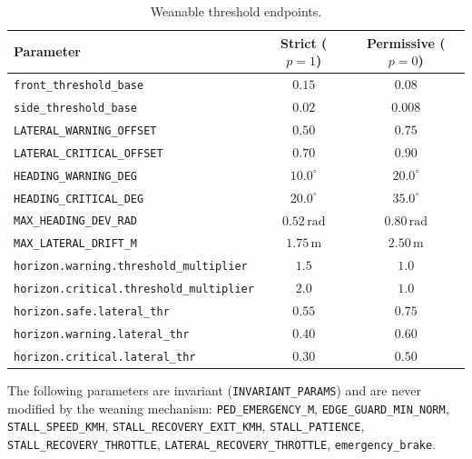 \begin{table}[H]
  \centering
  \caption{Weanable threshold endpoints.}
  \label{tab:hp-weanable}
  \small
  \begin{tabular}{@{}lcc@{}}
    \toprule
    \textbf{Parameter} & \textbf{Strict (\(p=1\))} & \textbf{Permissive (\(p=0\))} \\
    \midrule
    \texttt{front\_threshold\_base}                 & \(0.15\) & \(0.08\) \\
    \texttt{side\_threshold\_base}                  & \(0.02\) & \(0.008\) \\
    \texttt{LATERAL\_WARNING\_OFFSET}               & \(0.50\) & \(0.75\) \\
    \texttt{LATERAL\_CRITICAL\_OFFSET}              & \(0.70\) & \(0.90\) \\
    \texttt{HEADING\_WARNING\_DEG}                  & \(10.0^\circ\) & \(20.0^\circ\) \\
    \texttt{HEADING\_CRITICAL\_DEG}                 & \(20.0^\circ\) & \(35.0^\circ\) \\
    \texttt{MAX\_HEADING\_DEV\_RAD}                 & \(0.52\,\mathrm{rad}\) & \(0.80\,\mathrm{rad}\) \\
    \texttt{MAX\_LATERAL\_DRIFT\_M}                 & \(1.75\,\mathrm{m}\) & \(2.50\,\mathrm{m}\) \\
    \texttt{horizon.warning.threshold\_multiplier}  & \(1.5\) & \(1.0\) \\
    \texttt{horizon.critical.threshold\_multiplier} & \(2.0\) & \(1.0\) \\
    \texttt{horizon.safe.lateral\_thr}              & \(0.55\) & \(0.75\) \\
    \texttt{horizon.warning.lateral\_thr}           & \(0.40\) & \(0.60\) \\
    \texttt{horizon.critical.lateral\_thr}          & \(0.30\) & \(0.50\) \\
    \bottomrule
  \end{tabular}
\end{table}

The following parameters are invariant (\texttt{INVARIANT\_PARAMS}) and are
never modified by the weaning mechanism:
\texttt{PED\_EMERGENCY\_M}, \texttt{EDGE\_GUARD\_MIN\_NORM},
\texttt{STALL\_SPEED\_KMH}, \texttt{STALL\_RECOVERY\_EXIT\_KMH},
\texttt{STALL\_PATIENCE}, \texttt{STALL\_RECOVERY\_THROTTLE},
\texttt{LATERAL\_RECOVERY\_THROTTLE}, \texttt{emergency\_brake}.
